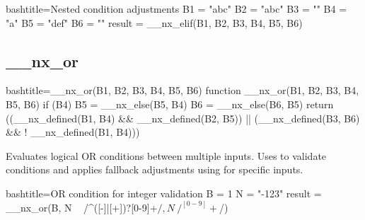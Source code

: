 \begin{NexCodeBox}{bash}{title={Nested condition adjustments}}
	B1 = "abc"
	B2 = "abc"
	B3 = ""
	B4 = "a"
	B5 = "def"
	B6 = ""
	result = __nx_elif(B1, B2, B3, B4, B5, B6)
\end{NexCodeBox}

\newpage
\subsection{__nx_or}
\label{__nx_or}
\begin{NexCodeBox}{bash}{title={__nx_or(B1, B2, B3, B4, B5, B6)}}
function __nx_or(B1, B2, B3, B4, B5, B6) {
	if (B4) {
		B5 = __nx_else(B5, B4)
		B6 = __nx_else(B6, B5)
	}
	return ((__nx_defined(B1, B4) && __nx_defined(B2, B5)) || (__nx_defined(B3, B6) && ! __nx_defined(B1, B4)))
}
\end{NexCodeBox}

\begin{NexMainBox}
	\begin{NexMainBox}
		Evaluates logical OR conditions between multiple inputs. Uses  to validate conditions and applies fallback adjustments using  for specific inputs.
	\end{NexMainBox}
	\begin{NexMainBox}
		\begin{NexListDark}
		\end{NexListDark}
	\end{NexMainBox}
\end{NexMainBox}

\begin{NexCodeBox}{bash}{title={OR condition for integer validation}}
	B = 1
	N = "-123"
	result = __nx_or(B, N ~ /^([-]|[+])?[0-9]+$/, N ~ /^[0-9]+$/)
\end{NexCodeBox}

